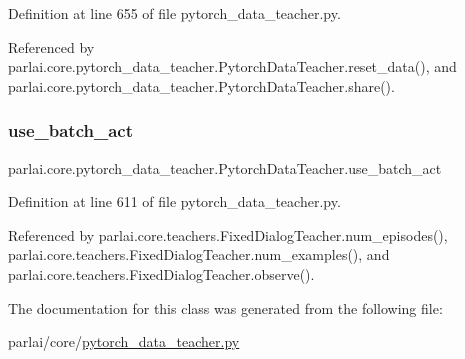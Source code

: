 Definition at line 655 of file pytorch\+\_\+data\+\_\+teacher.\+py.



Referenced by parlai.\+core.\+pytorch\+\_\+data\+\_\+teacher.\+Pytorch\+Data\+Teacher.\+reset\+\_\+data(), and parlai.\+core.\+pytorch\+\_\+data\+\_\+teacher.\+Pytorch\+Data\+Teacher.\+share().

\mbox{\label{classparlai_1_1core_1_1pytorch__data__teacher_1_1PytorchDataTeacher_ab332dd1715cc19c97b5dfbe69815cdcc}} 
\subsubsection{\texorpdfstring{use\+\_\+batch\+\_\+act}{use\_batch\_act}}
{\footnotesize\ttfamily parlai.\+core.\+pytorch\+\_\+data\+\_\+teacher.\+Pytorch\+Data\+Teacher.\+use\+\_\+batch\+\_\+act}



Definition at line 611 of file pytorch\+\_\+data\+\_\+teacher.\+py.



Referenced by parlai.\+core.\+teachers.\+Fixed\+Dialog\+Teacher.\+num\+\_\+episodes(), parlai.\+core.\+teachers.\+Fixed\+Dialog\+Teacher.\+num\+\_\+examples(), and parlai.\+core.\+teachers.\+Fixed\+Dialog\+Teacher.\+observe().



The documentation for this class was generated from the following file\+:\begin{DoxyCompactItemize}
\item 
parlai/core/\hyperlink{pytorch__data__teacher_8py}{pytorch\+\_\+data\+\_\+teacher.\+py}\end{DoxyCompactItemize}
